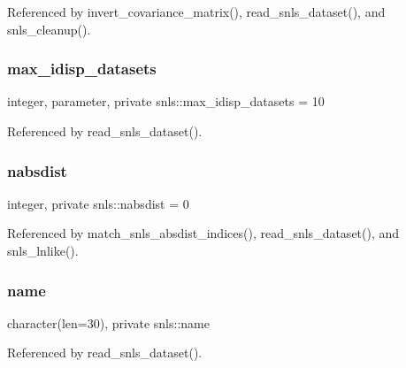 Referenced by invert\+\_\+covariance\+\_\+matrix(), read\+\_\+snls\+\_\+dataset(), and snls\+\_\+cleanup().

\mbox{\label{namespacesnls_a82d4a9b322c284cf9bba27e6c86cb4f9}} 
\subsubsection{\texorpdfstring{max\+\_\+idisp\+\_\+datasets}{max\_idisp\_datasets}}
{\footnotesize\ttfamily integer, parameter, private snls\+::max\+\_\+idisp\+\_\+datasets = 10\hspace{0.3cm}{\ttfamily [private]}}



Referenced by read\+\_\+snls\+\_\+dataset().

\mbox{\label{namespacesnls_afec63a8af55bb2bb06acac7b19c0fc4c}} 
\subsubsection{\texorpdfstring{nabsdist}{nabsdist}}
{\footnotesize\ttfamily integer, private snls\+::nabsdist = 0\hspace{0.3cm}{\ttfamily [private]}}



Referenced by match\+\_\+snls\+\_\+absdist\+\_\+indices(), read\+\_\+snls\+\_\+dataset(), and snls\+\_\+lnlike().

\mbox{\label{namespacesnls_a33bba3eb52cb06fe4ca4b1beb737c7f4}} 
\subsubsection{\texorpdfstring{name}{name}}
{\footnotesize\ttfamily character(len=30), private snls\+::name\hspace{0.3cm}{\ttfamily [private]}}



Referenced by read\+\_\+snls\+\_\+dataset().

\mbox{\label{namespacesnls_abc05ea854fb8f639d617703ff33dcf41}} 

